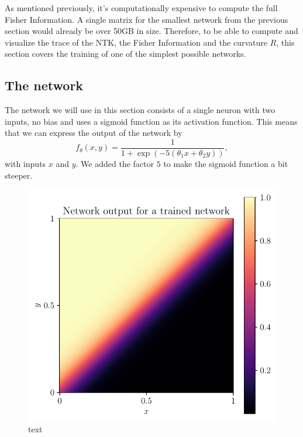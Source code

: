 As mentioned previously, it's computationally expensive to compute the full Fisher Information. A single matrix for the smallest network from the previous section would already be over 50GB in size. Therefore, to be able to compute and visualize the trace of the NTK, the Fisher Information and the curvature $R$, this section covers the training of one of the simplest possible networks.

\subsection{The network}
The network we will use in this section consists of a single neuron with two inputs, no bias and uses a sigmoid function \cite{ActivationFunctionOverview} as its activation function. This means that we can express the output of the network by 
\begin{equation}
	f_\theta(x,y) = \frac{1}{1+ \exp (-5(\theta_1 x + \theta_2 y))},
\end{equation}
with inputs $x$ and $y$. We added the factor $5$ to make the sigmoid function a bit steeper.




\begin{figure}
	\centering
	\includegraphics{Experiment2/plots/Network_output.pdf}
	\caption{text}
\end{figure}

